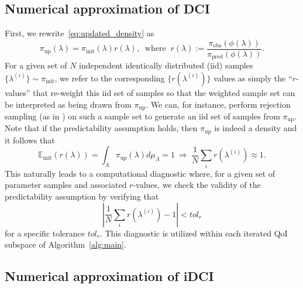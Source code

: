 \documentclass{article}
\newcommand{\pspace}{\Lambda}
\newcommand{\initdens}{\pi_{\text{init}}}
\newcommand{\updatedens}{\pi_{\text{up}}}
\newcommand{\predictdens}{\pi_\text{pred}}
\newcommand{\obsdens}{\pi_{\text{obs}}}
\begin{document}
\subsection{Numerical approximation of DCI}

First, we rewrite~\eqref{eq:updated_density} as
\begin{equation}\label{eq:updated_density_r}
    \updatedens(\lambda) = \initdens(\lambda) r(\lambda), \ \text{ where } \ r(\lambda) := \frac{\obsdens(\phi(\lambda))}{\predictdens(\phi(\lambda))}.
\end{equation}
For a given set of $N$ independent identically distributed (iid) samples $\{\lambda^{(i)}\}\sim\initdens$, we refer to the corresponding $\{r(\lambda^{(i)})\}$ values as simply the ``$r$-values'' that re-weight this iid set of samples so that the weighted sample set can be interpreted as being drawn from $\updatedens$.
We can, for instance, perform rejection sampling (as in \cite{BJW18a}) on such a sample set to generate an iid set of samples from $\updatedens$.
Note that if the predictability assumption holds, then $\updatedens$ is indeed a density and it follows that
\begin{equation}
     \mathbb{E}_\text{init}(r(\lambda)) = \int_\pspace \updatedens(\lambda) d\mu_\pspace = 1 \ \Rightarrow \ \frac{1}{N}\sum_i r(\lambda^{(i)}) \approx 1.
\end{equation}
This naturally leads to a computational diagnostic where, for a given set of parameter samples and associated $r$-values, we check the validity of the predictability assumption by verifying that
\begin{equation}\label{eq:diagnostic}
    \left\vert \frac{1}{N}\sum_i r(\lambda^{(i)}) - 1 \right\vert < tol_r
\end{equation}
for a specific tolerance $tol_r$.
This diagnostic is utilized within each iterated QoI subspace of Algorithm~\ref{alg:main}.

\subsection{Numerical approximation of iDCI}
\end{document}
